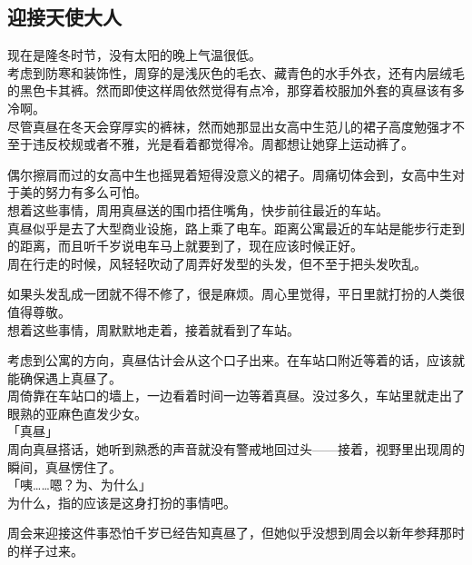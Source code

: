 \subsection{迎接天使大人}

现在是隆冬时节，没有太阳的晚上气温很低。\\

考虑到防寒和装饰性，周穿的是浅灰色的毛衣、藏青色的水手外衣，还有内层绒毛的黑色卡其裤。然而即使这样周依然觉得有点冷，那穿着校服加外套的真昼该有多冷啊。\\

尽管真昼在冬天会穿厚实的裤袜，然而她那显出女高中生范儿的裙子高度勉强才不至于违反校规或者不雅，光是看着都觉得冷。周都想让她穿上运动裤了。

偶尔擦肩而过的女高中生也摇晃着短得没意义的裙子。周痛切体会到，女高中生对于美的努力有多么可怕。\\

想着这些事情，周用真昼送的围巾捂住嘴角，快步前往最近的车站。\\

真昼似乎是去了大型商业设施，路上乘了电车。距离公寓最近的车站是能步行走到的距离，而且听千岁说电车马上就要到了，现在应该时候正好。\\

周在行走的时候，风轻轻吹动了周弄好发型的头发，但不至于把头发吹乱。

如果头发乱成一团就不得不修了，很是麻烦。周心里觉得，平日里就打扮的人类很值得尊敬。\\

想着这些事情，周默默地走着，接着就看到了车站。

考虑到公寓的方向，真昼估计会从这个口子出来。在车站口附近等着的话，应该就能确保遇上真昼了。\\

周倚靠在车站口的墙上，一边看着时间一边等着真昼。没过多久，车站里就走出了眼熟的亚麻色直发少女。\\

「真昼」\\

周向真昼搭话，她听到熟悉的声音就没有警戒地回过头——接着，视野里出现周的瞬间，真昼愣住了。\\

「咦……嗯？为、为什么」\\

为什么，指的应该是这身打扮的事情吧。

周会来迎接这件事恐怕千岁已经告知真昼了，但她似乎没想到周会以新年参拜那时的样子过来。\\

